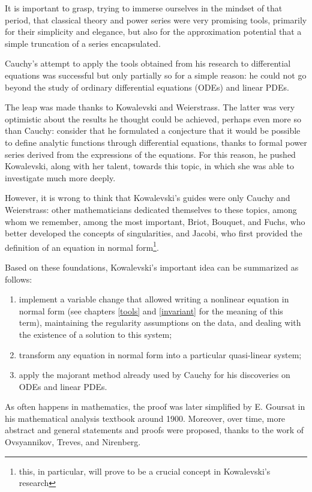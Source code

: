 It is important to grasp, trying to immerse ourselves in the mindset of that period, that classical theory and power series were very promising tools, primarily for their simplicity and elegance, but also for the approximation potential that a simple truncation of a series encapsulated.

Cauchy's attempt to apply the tools obtained from his research to differential equations was successful but only partially so for a simple reason: he could not go beyond the study of ordinary differential equations (ODEs) and linear PDEs.

The leap was made thanks to Kowalevski and Weierstrass. The latter was very optimistic about the results he thought could be achieved, perhaps even more so than Cauchy: consider that he formulated a conjecture that it would be possible to define analytic functions through differential equations, thanks to formal power series derived from the expressions of the equations. For this reason, he pushed Kowalevski, along with her talent, towards this topic, in which she was able to investigate much more deeply.

However, it is wrong to think that Kowalevski's guides were only Cauchy and Weierstrass: other mathematicians dedicated themselves to these topics, among whom we remember, among the most important, Briot, Bouquet, and Fuchs, who better developed the concepts of singularities, and Jacobi, who first provided the definition of an equation in normal form\footnote{this, in particular, will prove to be a crucial concept in Kowalevski's research}.

Based on these foundations, Kowalevski's important idea can be summarized as follows:
\begin{enumerate}
\item implement a variable change that allowed writing a nonlinear equation in normal form (see chapters \ref{tools} and \ref{invariant} for the meaning of this term), maintaining the regularity assumptions on the data, and dealing with the existence of a solution to this system;
\item transform any equation in normal form into a particular quasi-linear system;
\item apply the majorant method already used by Cauchy for his discoveries on ODEs and linear PDEs.
\end{enumerate}
As often happens in mathematics, the proof was later simplified by E. Goursat in his mathematical analysis textbook around 1900. Moreover, over time, more abstract and general statements and proofs were proposed, thanks to the work of Ovsyannikov, Treves, and Nirenberg.

